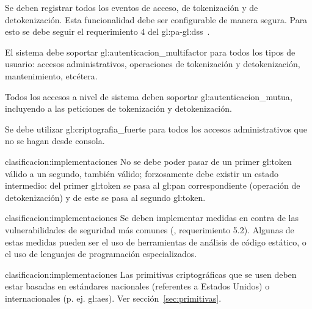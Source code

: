 {
  Se deben registrar todos los eventos de acceso, de tokenización y
  de detokenización. Esta funcionalidad debe ser configurable de manera
  segura. Para esto se debe seguir el requerimiento 4 del
  \gls{gl:pa}-\gls{gl:dss}~\cite{dss_pa}.
}

{
  El sistema debe soportar \gls{gl:autenticacion_multifactor} para todos
  los tipos de usuario: accesos administrativos, operaciones de tokenización
  y detokenización, mantenimiento, etcétera.
}

{
  Todos los accesos a nivel de sistema deben soportar
  \gls{gl:autenticacion_mutua}, incluyendo a las peticiones de tokenización
  y detokenización.
}

{
  Se debe utilizar \gls{gl:criptografia_fuerte} para todos los accesos
  administrativos que no se hagan desde consola.
}

{clasificacion:implementaciones}
{
  No se debe poder pasar de un primer \gls{gl:token} válido a un segundo,
  también válido; forzosamente debe existir un estado intermedio: del primer
  \gls{gl:token} se pasa al \gls{gl:pan} correspondiente (operación de
  detokenización) y de este se pasa al segundo \gls{gl:token}.
}

{clasificacion:implementaciones}
{
  Se deben implementar medidas en contra de las vulnerabilidades de
  seguridad más comunes (\cite{dss_pa}, requerimiento 5.2). Algunas de estas
  medidas pueden ser el uso de herramientas de análisis de código estático,
  o el uso de lenguajes de programación especializados.
}

{clasificacion:implementaciones}
{
  Las primitivas criptográficas que se usen deben estar basadas en
  estándares nacionales (referentes a Estados Unidos) o internacionales (p. ej.
  \gls{gl:aes}). Ver sección~\ref{sec:primitivas}.
}


